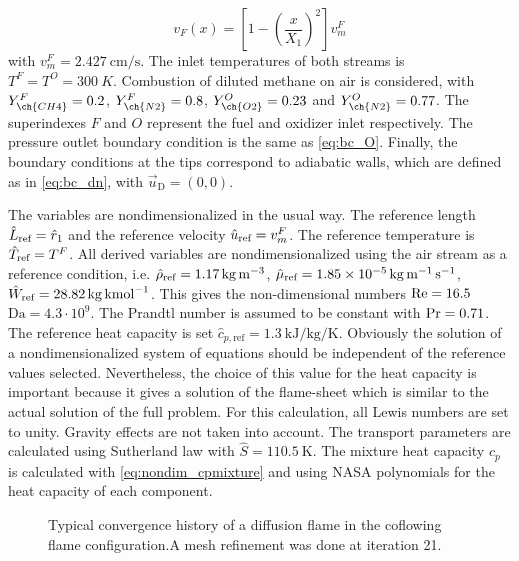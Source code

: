 \begin{equation}
	v_F(x) = \left[1-\left(\frac{x}{X_1}\right)^2\right]v_m^F
\end{equation}
with $v^F_m = \SI{2.427}{\centi \meter \per \second}$.  The inlet temperatures of both streams is  $T^F = T^O = \SI{300}{K}$. Combustion of diluted methane on air is considered, with $Y^F_{\ch{CH4}} = 0.2$, $Y^F_{\ch{N2}} = 0.8$, $Y^O_{\ch{O2}} = 0.23$ and $Y^O_{\ch{N2}} = 0.77$. The superindexes $F$ and $O$ represent the fuel and oxidizer inlet respectively. The pressure outlet boundary condition is the same as \cref{eq:bc_O}. Finally, the boundary conditions at the tips correspond to adiabatic walls, which are defined as in \cref{eq:bc_dn}, with $\vec{u}_{\text{D}} = (0,0)$.             

The variables are nondimensionalized in the usual way. The reference length $\hat L_{\text{ref}} = \hat{r}_1$ and the reference velocity $\hat u_{\text{ref}} =v^F_m$. The reference temperature is $\hat T_{\text{ref}} = T^F$.  All derived variables are nondimensionalized using the air stream as a reference condition, i.e. $\hat \rho_{\text{ref}} = \SI{1.17}{\kilo \gram \per \cubic \meter}$, $\hat \mu_{\text{ref}} = \SI{1.85e-5}{\kilo \gram \per \meter \per \second}$,$\hat W_{\text{ref}} = \SI{28.82}{\kilo \gram \per \kilo\mole}$. This gives the non-dimensional numbers $\text{Re} = 16.5$ $\text{Da} = 4.3\cdot 10^9$. The Prandtl number is assumed to be constant with $\text{Pr} = 0.71$. The reference heat capacity is set $\hat{c}_{p,\text{ref}}= \SI{1.3}{\kilo \joule \per \kilo \gram \per \kelvin}$. Obviously the solution of a nondimensionalized system of equations should be independent of the reference values selected. Nevertheless, the choice of this value for the heat capacity is important because it gives a solution of the flame-sheet which is similar to the actual solution of the full problem. For this calculation, all Lewis numbers are set to unity. Gravity effects are not taken into account. The transport parameters are calculated using Sutherland law with $\hat{S} = \SI{110.5}{\kelvin}$. The mixture heat capacity $c_p$ is calculated with \cref{eq:nondim_cpmixture} and using NASA polynomials for the heat capacity of each component.
\begin{figure}[t!]
	\centering
	\caption{Typical convergence history of a diffusion flame in the coflowing flame configuration.A mesh refinement was done at iteration 21. }
	\label{fig:CoFlow_ConvergenceStory}
\end{figure}


